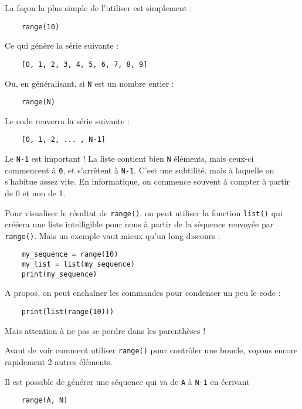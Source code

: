 La façon la plus simple de l'utiliser est simplement :

\begin{lstlisting}
    range(10)
\end{lstlisting}

Ce qui génère la série suivante :

\begin{lstlisting}
    [0, 1, 2, 3, 4, 5, 6, 7, 8, 9]
\end{lstlisting}

Ou, en généralisant, si \texttt{N} est un nombre entier :

\begin{lstlisting}
    range(N)
\end{lstlisting}

Le code renverra la série suivante :

\begin{lstlisting}
    [0, 1, 2, ... , N-1]
\end{lstlisting}

Le \texttt{N-1} est important ! La liste contient bien \texttt{N} éléments, mais ceux-ci commencent à \texttt{0}, et s'arrêtent à \texttt{N-1}. C'est une subtilité, mais à laquelle on s'habitue assez vite. En informatique, on commence souvent à compter à partir de 0 et non de 1.

Pour visualiser le résultat de \texttt{range()}, on peut utiliser la fonction \texttt{list()} qui crééera une liste intelligible pour nous à partir de la séquence renvoyée par \texttt{range()}. Mais un exemple vaut mieux qu'un long discours :

\begin{lstlisting}
    my_sequence = range(10)
    my_list = list(my_sequence)
    print(my_sequence)
\end{lstlisting}

A propos, on peut enchaîner les commandes pour condenser un peu le code :

\begin{lstlisting}
    print(list(range(10)))
\end{lstlisting}

Mais attention à ne pas se perdre dans les parenthèses !

Avant de voir comment utiliser \texttt{range()} pour contrôler une boucle, voyons encore rapidement 2 autres éléments.

Il est possible de générer une séquence qui va de \texttt{A} à \texttt{N-1} en écrivant

\begin{lstlisting}
    range(A, N)
\end{lstlisting}

